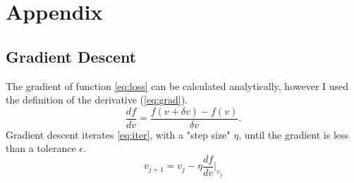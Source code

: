 \documentclass[11pt]{article}
\begin{document}
\printbibliography

\appendix
\section{Appendix}
\subsection{Gradient Descent}
\label{app:gradient-descent}
The gradient of function \autoref{eq:loss} can be calculated analytically, however I used the definition of the derivative (\autoref{eq:grad}).
\begin{equation}
    \frac{df}{dv} = \frac{f(v + \delta v) - f(v)}{\delta v}.
    \label{eq:grad}
\end{equation}
Gradient descent iterates \autoref{eq:iter}, with a "step size" $\eta$, until the gradient is less than a tolerance $\epsilon$.
\begin{equation}
    v_{j+1} = v_j - \eta \frac{df}{dv}\Bigr|_{v_j}
    \label{eq:iter}
\end{equation}
\end{document}
